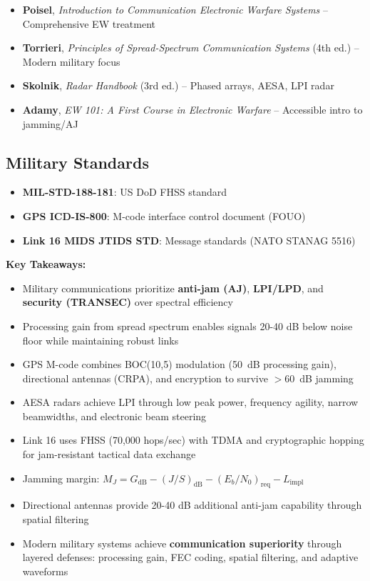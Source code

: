 \begin{itemize}
\item \textbf{Poisel}, \emph{Introduction to Communication Electronic Warfare Systems} -- Comprehensive EW treatment
\item \textbf{Torrieri}, \emph{Principles of Spread-Spectrum Communication Systems} (4th ed.) -- Modern military focus
\item \textbf{Skolnik}, \emph{Radar Handbook} (3rd ed.) -- Phased arrays, AESA, LPI radar
\item \textbf{Adamy}, \emph{EW 101: A First Course in Electronic Warfare} -- Accessible intro to jamming/AJ
\end{itemize}

\subsection{Military Standards}

\begin{itemize}
\item \textbf{MIL-STD-188-181}: US DoD FHSS standard
\item \textbf{GPS ICD-IS-800}: M-code interface control document (FOUO)
\item \textbf{Link 16 MIDS JTIDS STD}: Message standards (NATO STANAG 5516)
\end{itemize}

\textbf{Key Takeaways:}

\begin{itemize}
\item Military communications prioritize \textbf{anti-jam (AJ)}, \textbf{LPI/LPD}, and \textbf{security (TRAN\-SEC)} over spectral efficiency
\item Processing gain from spread spectrum enables signals 20-40 dB below noise floor while maintaining robust links
\item GPS M-code combines BOC(10,5) modulation (50~dB processing gain), directional antennas (CRPA), and encryption to survive $>60$~dB jamming
\item AESA radars achieve LPI through low peak power, frequency agility, narrow beam\-widths, and electronic beam steering
\item Link 16 uses FHSS (70,000 hops/sec) with TDMA and cryptographic hopping for jam-resistant tactical data exchange
\item Jamming margin: $M_J = G_{\text{dB}} - (J/S)_{\text{dB}} - (E_b/N_0)_{\text{req}} - L_{\text{impl}}$
\item Directional antennas provide 20-40 dB additional anti-jam capability through spatial filtering
\item Modern military systems achieve \textbf{communication superiority} through layered defenses: processing gain, FEC coding, spatial filtering, and adaptive waveforms
\end{itemize}
